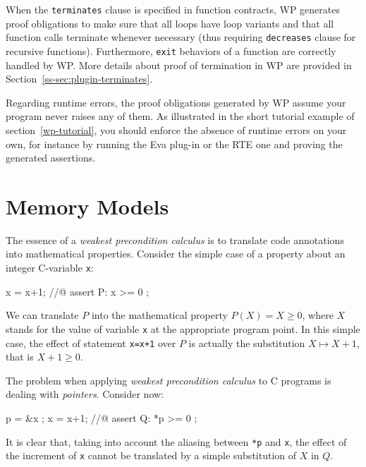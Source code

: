 When the \verb+terminates+ clause is specified in function contracts,
\textsf{WP} generates proof
obligations to make sure that all loops have loop variants and that all function
calls terminate whenever necessary (thus requiring \verb+decreases+ clause for
recursive functions). Furthermore, \texttt{exit} behaviors of a function are
correctly handled by \textsf{WP}. More details about proof of termination in
\textsf{WP} are provided in Section~\ref{ss-sec:plugin-terminates}.

Regarding runtime errors, the proof obligations generated by
\textsf{WP} assume your program never raises any of them. As
illustrated in the short tutorial example of
section~\ref{wp-tutorial}, you should enforce the absence of runtime
errors on your own, for instance by running the \textsf{Eva}
plug-in or the \textsf{RTE} one and proving the generated assertions.

\section{Memory Models}
\label{wp-intro-models}

The essence of a \emph{weakest precondition calculus} is to translate
code annotations into mathematical properties. Consider the simple case
of a property about an integer \textsf{C}-variable \texttt{x}:
\begin{ccode}
  x = x+1;
  //@ assert P: x >= 0 ;
\end{ccode}

We can translate $P$ into the mathematical property $P(X)=X \geq 0$,
where $X$ stands for the value of variable \texttt{x} at the
appropriate program point. In this simple case, the effect of
statement \texttt{x=x+1} over $P$ is actually the substitution
$X\mapsto X+1$, that is $X+1\geq 0$.

The problem when applying \emph{weakest precondition calculus} to
\textsf{C} programs is dealing with \emph{pointers}. Consider now:
\begin{ccode}
  p = &x ;
  x = x+1;
  //@ assert Q: *p >= 0 ;
\end{ccode}

It is clear that, taking into account the aliasing between \texttt{*p}
and \texttt{x}, the effect of the increment of \texttt{x} cannot be
translated by a simple substitution of $X$ in $Q$.

